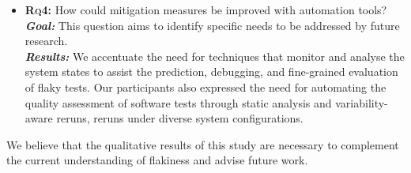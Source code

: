 \begin{itemize}[wide=10pt,noitemsep,topsep=0pt]
    \item \textbf{\textsc{Rq4:}} How could mitigation measures be improved with automation tools?\\
    \textit{\textbf{Goal:}} This question aims to identify specific needs to be addressed by future research. \\
    \textit{\textbf{Results:}} We accentuate the need for techniques that monitor and analyse the system states to assist the prediction, debugging, and fine-grained evaluation of flaky tests.
    Our participants also expressed the need for automating the quality assessment of software tests through static analysis and variability-aware reruns, \ie reruns under diverse system configurations. 
\end{itemize}

We believe that the qualitative results of this study are necessary to complement the current understanding of flakiness and advise future work.  
